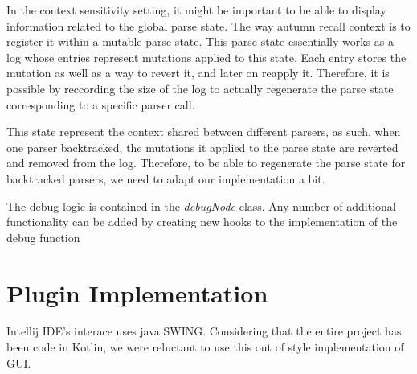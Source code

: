 	In the context sensitivity setting, it might be important to be able to display information related to the global parse state. The way autumn recall context is to register it within a mutable parse state. This parse state essentially works as a log whose entries represent mutations applied to this state. Each entry stores the mutation as well as a way to revert it, and later on reapply it. Therefore, it is possible by reccording the size of the log to actually regenerate the parse state corresponding to a specific parser call.

	\bigskip

	This state represent the context shared between different parsers, as such, when one parser backtracked, the mutations it applied to the parse state are reverted and removed from the log. Therefore, to be able to regenerate the parse state for backtracked parsers, we need to adapt our implementation a bit.

	\bigskip

	The debug logic is contained in the \textit{debugNode} class. Any number of additional functionality can be added by creating new hooks to the implementation of the debug function



	\section{Plugin Implementation}
	Intellij IDE's interace uses java SWING. Considering that the entire project has been code in Kotlin, we were reluctant to use this out of style implementation of GUI.

	\paragraph{}

